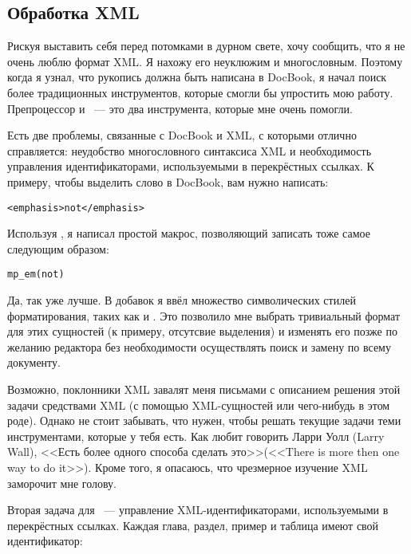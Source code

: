 \subsection{Обработка XML}

Рискуя выставить себя перед потомками в дурном свете, хочу сообщить,
что я не очень люблю формат XML. Я нахожу его неуклюжим и
многословным. Поэтому когда я узнал, что рукопись должна быть написана
в DocBook, я начал поиск более традиционных инструментов, которые
смогли бы упростить мою работу. Препроцессор  и
~--- это два инструмента, которые мне очень помогли.

Есть две проблемы, связанные с DocBook и XML, с которыми 
отлично справляется: неудобство многословного синтаксиса XML и
необходимость управления идентификаторами, используемыми в
перекрёстных ссылках. К примеру, чтобы выделить слово в DocBook, вам
нужно написать:

\begin{verbatim}
<emphasis>not</emphasis>
\end{verbatim}

Используя , я написал простой макрос, позволяющий записать
тоже самое следующим образом:

\begin{verbatim}
mp_em(not)
\end{verbatim}

Да, так уже лучше. В добавок я ввёл множество символических стилей
форматирования, таких как  и
. Это позволило мне выбрать тривиальный формат для
этих сущностей (к примеру, отсутсвие выделения) и изменять его позже
по желанию редактора без необходимости осуществлять поиск и замену по
всему документу.

Возможно, поклонники XML завалят меня письмами с описанием решения
этой задачи средствами XML (с помощью XML-сущностей или чего-нибудь в
этом роде). Однако не стоит забывать, что \UNIX{} нужен, чтобы решать
текущие задачи теми инструментами, которые у тебя есть. Как любит
говорить Ларри Уолл (Larry Wall), <<Есть более одного способа сделать
это>>(<<There is more then one way to do it>>). Кроме того, я
опасаюсь, что чрезмерное изучение XML заморочит мне голову.

Вторая задача для ~--- управление XML-идентификаторами,
используемыми в перекрёстных ссылках. Каждая глава, раздел, пример и
таблица имеют свой идентификатор:

